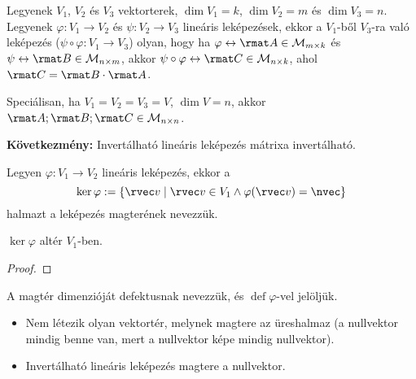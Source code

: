 \begin{statement}
  Legyenek $V_1$, $V_2$ és $V_3$ vektorterek, $\dim V_1 = k$, $\dim V_2 = m$ és
  $\dim V_3 = n$. Legyenek $\varphi: V_1 \rightarrow V_2$ és $\psi: V_2
    \rightarrow V_3$ lineáris leképezések, ekkor a $V_1$-ből $V_3$-ra való
  leképezés ($\psi \circ \varphi: V_1 \rightarrow V_3$) olyan, hogy ha
  $\varphi \leftrightarrow \rmat A \in \mathcal M_{m \times k}$ és
  $\psi \leftrightarrow \rmat B \in \mathcal M_{n \times m}$, akkor
  $\psi \circ \varphi \leftrightarrow \rmat C \in \mathcal M_{n \times k}$, ahol
  $\rmat C = \rmat B \cdot \rmat A$.

  Speciálisan, ha $V_1 = V_2 = V_3 = V$, $\dim V = n$, akkor
  $\rmat A; \rmat B; \rmat C \in \mathcal M_{n \times n}$.

  {\sffamily\bfseries Következmény:}
  Invertálható lineáris leképezés mátrixa invertálható.
\end{statement}

\begin{definition}
  Legyen $\varphi: V_1 \rightarrow V_2$ lineáris leképezés, ekkor a
  $$
    \ker \varphi := \{
    \rvec v \; | \; \rvec v \in V_1 \land \varphi(\rvec v) = \nvec
    \}
  $$
  halmazt a leképezés magterének nevezzük.
\end{definition}

\begin{statement}
  $\ker \varphi$ altér $V_1$-ben.

  \begin{proof}
    \vspace{6em}
  \end{proof}
\end{statement}

\begin{definition}
  A magtér dimenzióját defektusnak nevezzük, és $\operatorname{def} \varphi$-vel
  jelöljük.
\end{definition}

\begin{note}
  \begin{itemize}
    \item Nem létezik olyan vektortér, melynek magtere az üreshalmaz (a
          nullvektor mindig benne van, mert a nullvektor képe mindig nullvektor).

    \item Invertálható lineáris leképezés magtere a nullvektor.
  \end{itemize}
\end{note}

